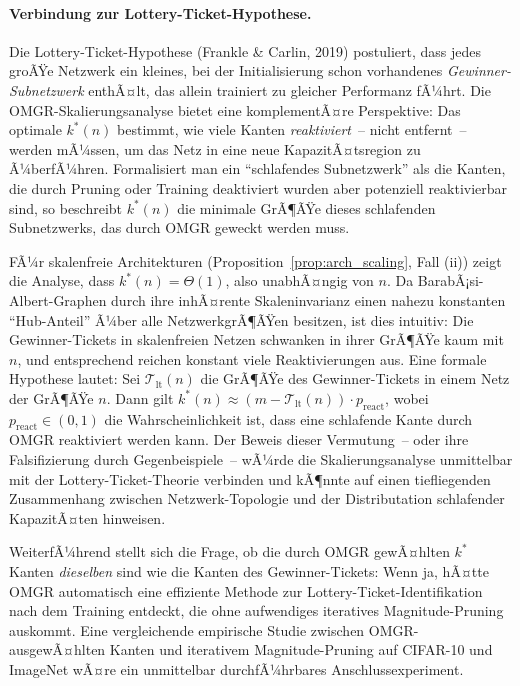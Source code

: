 ﻿\documentclass[12pt, a4paper, openany]{report}
\begin{document}
\paragraph{Verbindung zur Lottery-Ticket-Hypothese.}
Die Lottery-Ticket-Hypothese (Frankle \& Carlin, 2019) postuliert, dass jedes
groÃŸe Netzwerk ein kleines, bei der Initialisierung schon vorhandenes
\emph{Gewinner-Subnetzwerk} enthÃ¤lt, das allein trainiert zu gleicher Performanz
fÃ¼hrt.  Die OMGR-Skalierungsanalyse bietet eine komplementÃ¤re Perspektive:
Das optimale $k^*(n)$ bestimmt, wie viele Kanten \emph{reaktiviert}~-- nicht
entfernt~-- werden mÃ¼ssen, um das Netz in eine neue KapazitÃ¤tsregion zu
Ã¼berfÃ¼hren.  Formal\-isiert man ein ``schlafendes Subnetzwerk'' als die Kanten,
die durch Pruning oder Training deaktiviert wurden aber potenziell reaktivierbar
sind, so beschreibt $k^*(n)$ die minimale GrÃ¶ÃŸe dieses schlafenden
Subnetzwerks, das durch OMGR geweckt werden muss.

FÃ¼r skalenfreie Architekturen (Proposition~\ref{prop:arch_scaling}, Fall (ii))
zeigt die Analyse, dass $k^*(n) = \Theta(1)$, also unabhÃ¤ngig von $n$.  Da
BarabÃ¡si-Albert-Graphen durch ihre inhÃ¤rente Skaleninvarianz einen
nahezu konstanten ``Hub-Anteil'' Ã¼ber alle NetzwerkgrÃ¶ÃŸen besitzen, ist dies
intuitiv: Die Gewinner-Tickets in skalenfreien Netzen schwanken in ihrer
GrÃ¶ÃŸe kaum mit $n$, und entsprechend reichen konstant viele Reaktivierungen
aus.  Eine formale Hypothese lautet: Sei $\mathcal{T}_{\mathrm{lt}}(n)$
die GrÃ¶ÃŸe des Gewinner-Tickets in einem Netz der GrÃ¶ÃŸe $n$.  Dann gilt
$k^*(n) \approx (m - \mathcal{T}_{\mathrm{lt}}(n)) \cdot p_{\mathrm{react}}$,
wobei $p_{\mathrm{react}} \in (0,1)$ die Wahrscheinlichkeit ist, dass eine
schlafende Kante durch OMGR reaktiviert werden kann.  Der Beweis dieser
Vermutung~-- oder ihre Falsifizierung durch Gegenbeispiele~-- wÃ¼rde die
Skalierungsanalyse unmittelbar mit der Lottery-Ticket-Theorie verbinden und
kÃ¶nnte auf einen tiefliegenden Zusammenhang zwischen Netzwerk-Topologie und
der Distributation schlafender KapazitÃ¤ten hinweisen.

WeiterfÃ¼hrend stellt sich die Frage, ob die durch OMGR gewÃ¤hlten $k^*$ Kanten
\emph{dieselben} sind wie die Kanten des Gewinner-Tickets: Wenn ja, hÃ¤tte OMGR
automatisch eine effiziente Methode zur Lottery-Ticket-Identifikation nach dem
Training entdeckt, die ohne aufwendiges iteratives Magnitude-Pruning auskommt.
Eine vergleichende empirische Studie zwischen OMGR-ausgewÃ¤hlten Kanten und
iterativem Magnitude-Pruning auf CIFAR-10 und ImageNet wÃ¤re ein unmittelbar
durchfÃ¼hrbares Anschlussexperiment.
\end{document}
